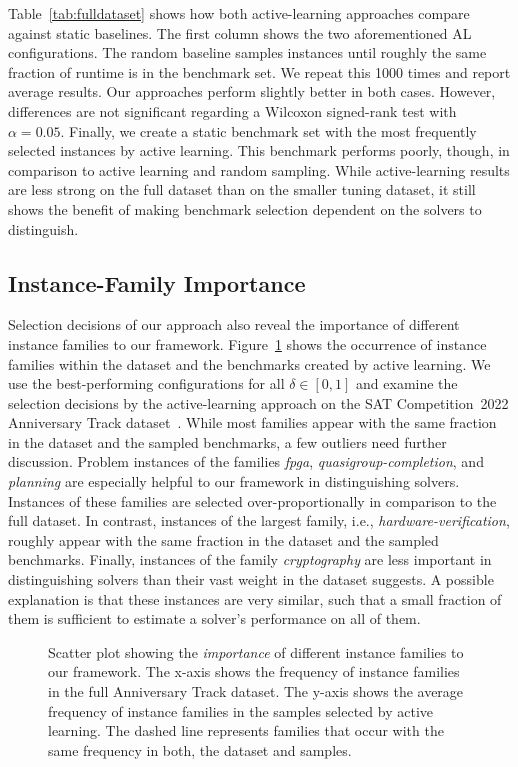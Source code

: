 \documentclass[runningheads]{llncs}
\begin{document}
Table~\ref{tab:fulldataset} shows how both active-learning approaches compare against static baselines.
The first column shows the two aforementioned AL configurations.
The random baseline samples instances until roughly the same fraction of runtime is in the benchmark set.
We repeat this 1000 times and report average results.
Our approaches perform slightly better in both cases.
However, differences are not significant regarding a Wilcoxon signed-rank test with $\alpha = 0.05$.
Finally, we create a static benchmark set with the most frequently selected instances by active learning.
This benchmark performs poorly, though, in comparison to active learning and random sampling.
While active-learning results are less strong on the full dataset than on the smaller tuning dataset, it still shows the benefit of making benchmark selection dependent on the solvers to distinguish.

\subsection{Instance-Family Importance}

Selection decisions of our approach also reveal the importance of different instance families to our framework.
Figure~\ref{fig:annifinalfamilies} shows the occurrence of instance families within the dataset and the benchmarks created by active learning.
We use the best-performing configurations for all $\delta \in \left[0, 1\right]$ and examine the selection decisions by the active-learning approach on the SAT Competition~2022 Anniversary Track dataset~\cite{sat2022}.
While most families appear with the same fraction in the dataset and the sampled benchmarks, a few outliers need further discussion.
Problem instances of the families \emph{fpga}, \emph{quasigroup-completion}, and \emph{planning} are especially helpful to our framework in distinguishing solvers.
Instances of these families are selected over-proportionally in comparison to the full dataset.
In contrast, instances of the largest family, i.e., \emph{hardware-verification}, roughly appear with the same fraction in the dataset and the sampled benchmarks.
Finally, instances of the family \emph{cryptography} are less important in distinguishing solvers than their vast weight in the dataset suggests.
A possible explanation is that these instances are very similar, such that a small fraction of them is sufficient to estimate a solver's performance on all of them.

\begin{figure}[htb!]
  \centering
  \caption{
    Scatter plot showing the \emph{importance} of different instance families to our framework.
    The x-axis shows the frequency of instance families in the full Anniversary Track dataset.
    The y-axis shows the average frequency of instance families in the samples selected by active learning.
    The dashed line represents families that occur with the same frequency in both, the dataset and samples.
  }
  \label{fig:annifinalfamilies}
\end{figure}
\end{document}
